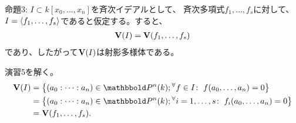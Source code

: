\begin{framed}
  命題3:
  $I\subset k[x_0,\dots,x_n]$を斉次イデアルとして、
  斉次多項式$f_1,\dots,f_s$に対して、
  $I=\left\langle f_1,\dots,f_s \right\rangle$であると仮定する。すると、
  \begin{align}
    \textbf V(I) = \textbf V(f_1,\dots,f_s)
  \end{align}
  であり、したがって$\textbf V(I)$は射影多様体である。
\end{framed}
\begin{myproof}
  演習5を解く。
  \begin{align}
    \var(I)
    &=
    \set{(a_0:\dots:a_n) \in \P^n(k); \Forall{f\in I}f(a_0,\dots,a_n) = 0}\\
    &=
    \set{(a_0:\dots:a_n) \in \P^n(k); \Forall{i=1,\dots,s}f_i(a_0,\dots,a_n) = 0}\\
    &=
    \var(f_1,\dots,f_s).
  \end{align}
\end{myproof}

